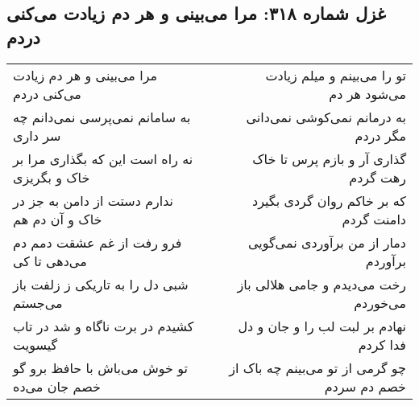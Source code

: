 \begin{center}
\section*{غزل شماره ۳۱۸: مرا می‌بینی و هر دم زیادت می‌کنی دردم}
\label{sec:sh318}
\begin{longtable}{l p{0.5cm} r}
مرا می‌بینی و هر دم زیادت می‌کنی دردم
&&
تو را می‌بینم و میلم زیادت می‌شود هر دم
\\
به سامانم نمی‌پرسی نمی‌دانم چه سر داری
&&
به درمانم نمی‌کوشی نمی‌دانی مگر دردم
\\
نه راه است این که بگذاری مرا بر خاک و بگریزی
&&
گذاری آر و بازم پرس تا خاک رهت گردم
\\
ندارم دستت از دامن به جز در خاک و آن دم هم
&&
که بر خاکم روان گردی بگیرد دامنت گردم
\\
فرو رفت از غم عشقت دمم دم می‌دهی تا کی
&&
دمار از من برآوردی نمی‌گویی برآوردم
\\
شبی دل را به تاریکی ز زلفت باز می‌جستم
&&
رخت می‌دیدم و جامی هلالی باز می‌خوردم
\\
کشیدم در برت ناگاه و شد در تاب گیسویت
&&
نهادم بر لبت لب را و جان و دل فدا کردم
\\
تو خوش می‌باش با حافظ برو گو خصم جان می‌ده
&&
چو گرمی از تو می‌بینم چه باک از خصم دم سردم
\\
\end{longtable}
\end{center}
